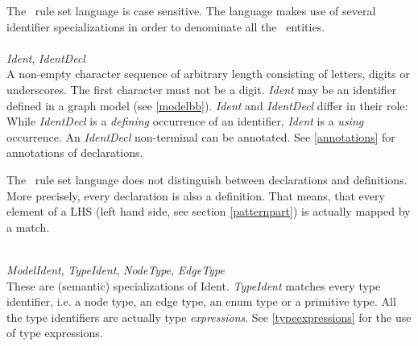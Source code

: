 The \GrG\ rule set language is case sensitive. The language makes use of several identifier specializations in order to denominate all the \GrG\ entities.\\
\\
\emph{Ident}, \emph{IdentDecl}\\ \nopagebreak
A non-empty character sequence of arbitrary length consisting of letters, digits or underscores. The first character must not be a digit. \emph{Ident} may be an identifier defined in a graph model (see \ref{modelbb}). \emph{Ident} and \emph{IdentDecl} differ in their role: While \emph{IdentDecl} is a \emph{defining} occurrence of an identifier, \emph{Ident} is a \emph{using} occurrence. An \emph{IdentDecl} non-terminal can be annotated. See \ref{annotations} for annotations of declarations.
\begin{note}
  The \GrG\ rule set language does not distinguish between declarations and definitions. More precisely, every declaration is also a definition. That means, that every element of a LHS (left hand side, see section \ref{patternpart}) is actually mapped by a match. 
\end{note}
\mbox{ }\\
\emph{ModelIdent}, \emph{TypeIdent}, \emph{NodeType}, \emph{EdgeType}\\
These are (semantic) specializations of Ident. \emph{TypeIdent} matches every type identifier, i.e. a node type, an edge type, an enum type or a primitive type. All the type identifiers are actually type \emph{expressions}. See \ref{typeexpressions} for the use of type expressions.\\

